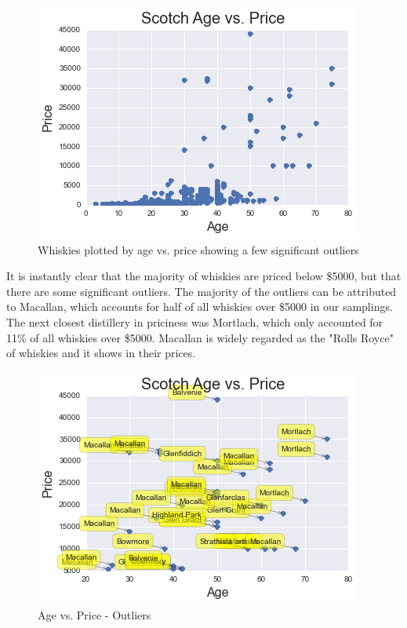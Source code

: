\begin{figure}[htb]
\centering
\includegraphics[scale=1]{age_vs_price1} 
\caption{Whiskies plotted by age vs. price showing a few significant outliers}
\label{fig:age_vs_price1} 
\end{figure}

\pagebreak

It is instantly clear that the majority of whiskies are priced below \$5000, but that there are some significant outliers. The majority of the outliers can be attributed to Macallan, which accounts for half of all whiskies over \$5000 in our samplings. The next closest distillery in priciness was Mortlach, which only accounted for 11\% of all whiskies over \$5000. Macallan is widely regarded as the "Rolls Royce" of whiskies and it shows in their prices.



\begin{figure}[htb]
\centering
\includegraphics[scale=1]{age_vs_price_outliers} 
\caption{Age vs. Price - Outliers}
\label{fig:age_vs_price_outliers} 
\end{figure}

